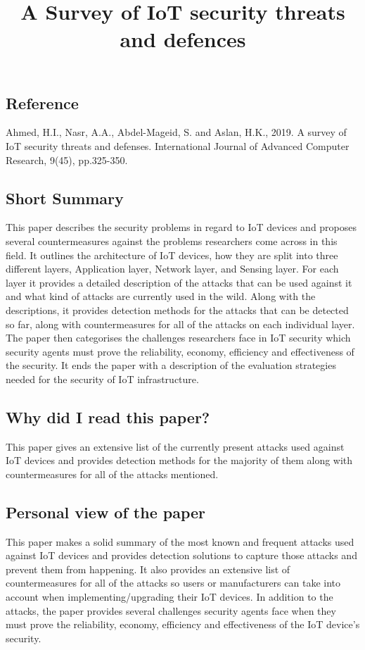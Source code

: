 \documentclass[11pt,a4paper]{article}
\title{A Survey of IoT security threats and defences}
\author{}
\date{}
\begin{document}
\maketitle

\subsection*{Reference}
Ahmed, H.I., Nasr, A.A., Abdel-Mageid, S. and Aslan, H.K., 2019. A survey of IoT security threats and defenses. International Journal of Advanced Computer Research, 9(45), pp.325-350.

\subsection*{Short Summary} 
This paper describes the security problems in regard to IoT devices and proposes several countermeasures against the problems researchers come across in this field.  It outlines the architecture of IoT devices, how they are split into three different layers, Application layer, Network layer, and Sensing layer. For each layer it provides a detailed description of the attacks that can be used against it and what kind of attacks are currently used in the wild. Along with the descriptions, it provides detection methods for the attacks that can be detected so far, along with countermeasures for all of the attacks on each individual layer. The paper then categorises the challenges researchers face in IoT security which security agents must prove the reliability, economy, efficiency and effectiveness of the security. It ends the paper with a description of the evaluation strategies needed for the security of IoT infrastructure.  

\subsection*{Why did I read this paper?}
This paper gives an extensive list of the currently present attacks used against IoT devices and provides detection methods for the majority of them along with countermeasures for all of the attacks mentioned. 

\subsection*{Personal view of the paper}
This paper makes a solid summary of the most known and frequent attacks used against IoT devices and provides detection solutions to capture those attacks and prevent them from happening. It also provides an extensive list of countermeasures for all of the attacks so users or manufacturers can take into account when implementing/upgrading their IoT devices. In addition to the attacks, the paper provides several challenges security agents face when they must prove the reliability, economy, efficiency and effectiveness of the IoT device’s security. 
\end{document}
